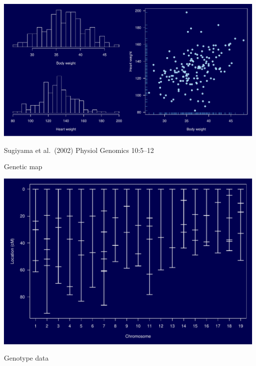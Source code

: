 \documentclass[12pt]{article}
\newcommand{\headsize}{\fontsize{35}{35} \selectfont}
\newcommand{\smallestsize}{\fontsize{18}{22} \selectfont}
\begin{document}
\vspace{30mm}

\centerline{\includegraphics{FigsA/pheno.pdf}}

\vfill
\smallestsize
\color{myblue}
Sugiyama et al.\ (2002) Physiol Genomics 10:5--12


\newpage

\headsize \color{myyellow}
\hfill \begin{minipage}{5.75in}
\centering
Genetic map
\end{minipage}

\vfill

\centerline{\includegraphics{FigsA/geneticmap.pdf}}

\newpage

\headsize \color{myyellow}
\hfill \begin{minipage}{5.75in}
\centering
Genotype data
\end{minipage}

\vfill
\end{document}
